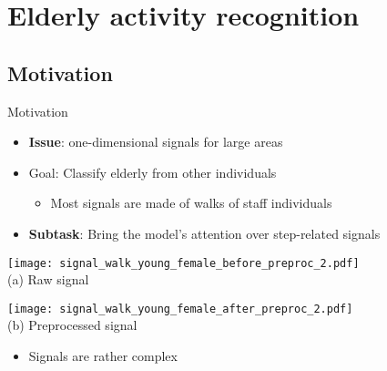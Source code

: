 \section{Elderly activity recognition}

\subsection{Motivation}

\begin{frame}{Motivation}{}
\begin{itemize}
    \item \textbf{Issue}: one-dimensional signals for large areas
    \item Goal: Classify elderly from other individuals
    \begin{itemize}
        \item Most signals are made of walks of staff individuals
    \end{itemize}
    \item \textbf{Subtask}: Bring the model's attention over step-related signals
\end{itemize}

\pause
    \begin{minipage}{\linewidth}
        \centering
        \begin{minipage}{0.49\linewidth}
            \centering
            \texttt{[image: signal\_walk\_young\_female\_before\_preproc\_2.pdf]}\\
            {\small (a)\; Raw signal}
        \end{minipage}
        \begin{minipage}{0.49\linewidth}
            \centering
            \texttt{[image: signal\_walk\_young\_female\_after\_preproc\_2.pdf]}\\
            {\small (b)\; Preprocessed signal}
        \end{minipage}
    \end{minipage}
\begin{itemize}
    \item Signals are rather complex
\end{itemize}


\end{frame}
